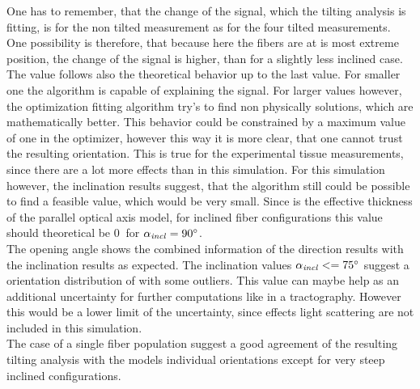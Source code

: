 One has to remember, that the change of the signal, which the tilting analysis is fitting, is for the non tilted measurement as for the four tilted measurements.
One possibility is therefore, that because here the fibers are at is most extreme position, the change of the signal is higher, than for a slightly less inclined case.
\\
% 
The \trel{} value follows also the theoretical behavior up to the last value.
For \trel{} smaller one the algorithm is capable of explaining the signal.
For larger \trel{} values however, the optimization fitting algorithm try's to find non physically solutions, which are mathematically better.
This behavior could be constrained by a maximum \trel{} value of one in the optimizer, however this way it is more clear, that one cannot trust the resulting orientation.
This is true for the experimental tissue measurements, since there are a lot more effects than in this simulation.
For this simulation however, the inclination results suggest, that the algorithm still could be possible to find a feasible \trel{} value, which would be very small.
Since \trel{} is the effective thickness of the parallel optical axis model, for inclined fiber configurations this value should theoretical be $\SI{0}{}$ for $\textnormal{$\alpha_{\mathit{incl}}$}=\SI{90}{\degree}$.
\\
% 
The opening angle shows the combined information of the direction results with the inclination results as expected.
The inclination values $\textnormal{$\alpha_{\mathit{incl}}$} <= \SI{75}{\degree}$ suggest a orientation distribution of \dummy{} with some outliers.
This value can maybe help as an additional uncertainty for further computations like in a tractography.
However this would be a lower limit of the uncertainty, since effects light scattering are not included in this simulation.
\\
% 
The case of a single fiber population suggest a good agreement of the resulting tilting analysis with the models individual orientations except for very steep inclined configurations.
% 
